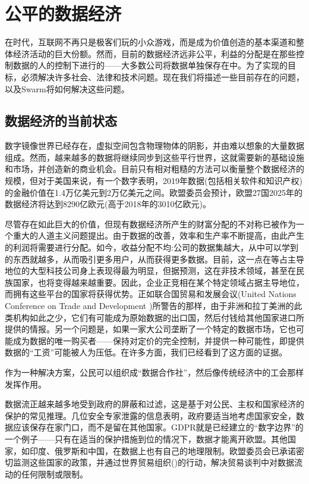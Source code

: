 \section{公平的数据经济}\label{sec:fair-data}
\green{}

在时代，互联网不再只是极客们玩的小众游戏，而是成为价值创造的基本渠道和整体经济活动的巨大份额。然而，目前的数据经济远非公平，利益的分配是在那些控制数据的人的控制下进行的——大多数公司将数据单独保存在中。为了实现的目标，必须解决许多社会、法律和技术问题。现在我们将描述一些目前存在的问题，以及Swarm将如何解决这些问题。 

\subsection{数据经济的当前状态\statusgreen} \label{sec:dataeconomy}

数字镜像世界已经存在，虚拟空间包含物理物体的阴影，并由难以想象的大量数据\cite{MirrorWorlds2020Feb}组成。然而，越来越多的数据将继续同步到这些平行世界，这就需要新的基础设施和市场，并创造新的商业机会。目前只有相对粗糙的方法可以衡量整个数据经济的规模，但对于美国来说，有一个数字表明，2019年数据(包括相关软件和知识产权)的金融价值在1.4万亿美元到2万亿美元之间。欧盟委员会预计，欧盟27国2025年的数据经济将达到8290亿欧元(高于2018年的3010亿欧元)。

尽管存在如此巨大的价值，但现有数据经济所产生的财富分配的不对称已被作为一个重大的人道主义问题提出。由于数据的改善，效率和生产率不断提高，由此产生的利润将需要进行分配。如今，收益分配不均:公司的数据集越大，从中可以学到的东西就越多，从而吸引更多用户，从而获得更多数据。目前，这一点在等占主导地位的大型科技公司身上表现得最为明显，但据预测，这在非技术领域，甚至在民族国家，也将变得越来越重要。因此，企业正竞相在某个特定领域占据主导地位，而拥有这些平台的国家将获得优势。正如联合国贸易和发展会议(United Nations Conference on Trade and Development \cite{TheWinner2020Feb})所警告的那样，由于非洲和拉丁美洲的此类机构如此之少，它们有可能成为原始数据的出口国，然后付钱给其他国家进口所提供的情报。另一个问题是，如果一家大公司垄断了一个特定的数据市场，它也可能成为数据的唯一购买者——保持对定价的完全控制，并提供一种可能性，即提供数据的“工资”可能被人为压低。在许多方面，我们已经看到了这方面的证据。 

作为一种解决方案，公民可以组织成“数据合作社”，然后像传统经济中的工会那样发挥作用。 

数据流正越来越多地受到政府的屏蔽和过滤，这是基于对公民、主权和国家经济的保护的常见推理。几位安全专家泄露的信息表明，政府要适当地考虑国家安全，数据应该保存在家门口，而不是留在其他国家。GDPR就是已经建立的“数字边界”的一个例子——只有在适当的保护措施到位的情况下，数据才能离开欧盟。其他国家，如印度、俄罗斯和中国，在数据上也有自己的地理限制。欧盟委员会已承诺密切监测这些国家的政策，并通过世界贸易组织(\cite{EUWhitePaperAI2020Feb})的行动，解决贸易谈判中对数据流动的任何限制或限制。

